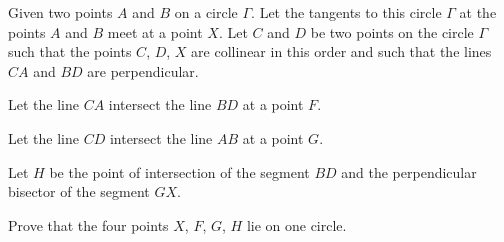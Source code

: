 Given two points $A$ and $B$ on a circle $\varGamma$. Let the tangents to this circle $\varGamma$ at the points $A$ and $B$ meet at a point $X$. Let $C$ and $D$ be two points on the circle $\varGamma$ such that the points $C$, $D$, $X$ are collinear in this order and such that the lines $CA$ and $BD$ are perpendicular.

Let the line $CA$ intersect the line $BD$ at a point $F$.

Let the line $CD$ intersect the line $AB$ at a point $G$.

Let $H$ be the point of intersection of the segment $BD$ and the perpendicular bisector of the segment $GX$.

Prove that the four points $X$, $F$, $G$, $H$ lie on one circle.